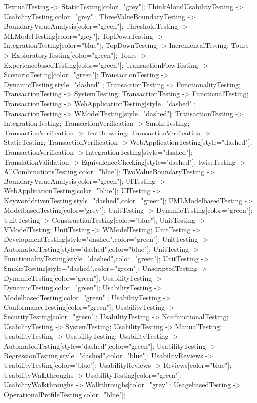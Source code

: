 \documentclass{article}
\begin{document}
{TextualTesting -> StaticTesting[color="grey"];
ThinkAloudUsabilityTesting -> UsabilityTesting[color="grey"];
ThreeValueBoundaryTesting -> BoundaryValueAnalysis[color="green"];
ThresholdTesting -> MLModelTesting[color="grey"];
TopDownTesting -> IntegrationTesting[color="blue"];
TopDownTesting -> IncrementalTesting;
Tours -> ExploratoryTesting[color="green"];
Tours -> ExperiencebasedTesting[color="green"];
TransactionFlowTesting -> ScenarioTesting[color="green"];
TransactionTesting -> DynamicTesting[style="dashed"];
TransactionTesting -> FunctionalityTesting;
TransactionTesting -> SystemTesting;
TransactionTesting -> FunctionalTesting;
TransactionTesting -> WebApplicationTesting[style="dashed"];
TransactionTesting -> WModelTesting[style="dashed"];
TransactionTesting -> IntegrationTesting;
TransactionVerification -> SmokeTesting;
TransactionVerification -> TestBrowsing;
TransactionVerification -> StaticTesting;
TransactionVerification -> WebApplicationTesting[style="dashed"];
TransactionVerification -> IntegrationTesting[style="dashed"];
TranslationValidation -> EquivalenceChecking[style="dashed"];
twiseTesting -> AllCombinationsTesting[color="blue"];
TwoValueBoundaryTesting -> BoundaryValueAnalysis[color="green"];
UITesting -> WebApplicationTesting[color="blue"];
UITesting -> KeyworddrivenTesting[style="dashed",color="green"];
UMLModelbasedTesting -> ModelbasedTesting[color="grey"];
UnitTesting -> DynamicTesting[color="green"];
UnitTesting -> ConstructionTesting[color="blue"];
UnitTesting -> VModelTesting;
UnitTesting -> WModelTesting;
UnitTesting -> DevelopmentTesting[style="dashed",color="green"];
UnitTesting -> AutomatedTesting[style="dashed",color="blue"];
UnitTesting -> FunctionalityTesting[style="dashed",color="green"];
UnitTesting -> SmokeTesting[style="dashed",color="green"];
UnscriptedTesting -> DynamicTesting[color="green"];
UsabilityTesting -> DynamicTesting[color="green"];
UsabilityTesting -> ModelbasedTesting[color="green"];
UsabilityTesting -> ConformanceTesting[color="green"];
UsabilityTesting -> SecurityTesting[color="green"];
UsabilityTesting -> NonfunctionalTesting;
UsabilityTesting -> SystemTesting;
UsabilityTesting -> ManualTesting;
UsabilityTesting -> UsabilityTesting;
UsabilityTesting -> AutomatedTesting[style="dashed",color="green"];
UsabilityTesting -> RegressionTesting[style="dashed",color="blue"];
UsabilityReviews -> UsabilityTesting[color="blue"];
UsabilityReviews -> Reviews[color="blue"];
UsabilityWalkthroughs -> UsabilityTesting[color="green"];
UsabilityWalkthroughs -> Walkthroughs[color="grey"];
UsagebasedTesting -> OperationalProfileTesting[color="blue"];
}
\end{document}
